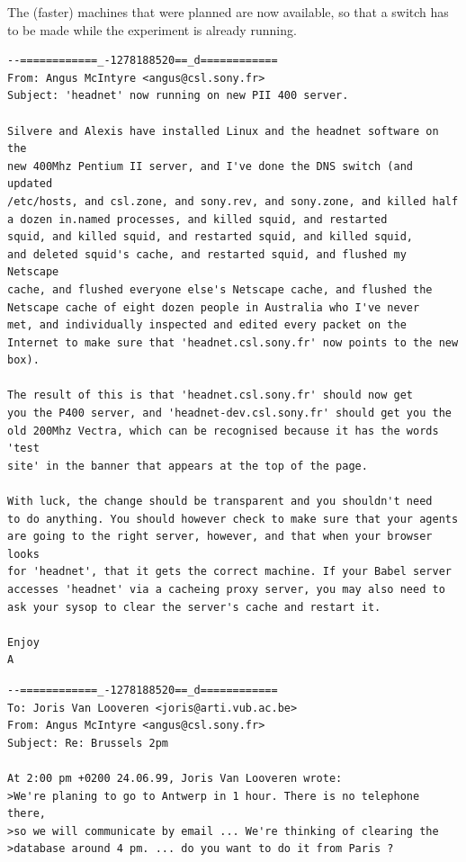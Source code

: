 
The (faster) machines that were planned are now available, so that a switch has to be made while the 
experiment is already running. 
\newline
\footnotesize{
\begin{verbatim}
--============_-1278188520==_d============
From: Angus McIntyre <angus@csl.sony.fr>
Subject: 'headnet' now running on new PII 400 server.

Silvere and Alexis have installed Linux and the headnet software on the 
new 400Mhz Pentium II server, and I've done the DNS switch (and updated
/etc/hosts, and csl.zone, and sony.rev, and sony.zone, and killed half 
a dozen in.named processes, and killed squid, and restarted 
squid, and killed squid, and restarted squid, and killed squid, 
and deleted squid's cache, and restarted squid, and flushed my Netscape
cache, and flushed everyone else's Netscape cache, and flushed the 
Netscape cache of eight dozen people in Australia who I've never 
met, and individually inspected and edited every packet on the 
Internet to make sure that 'headnet.csl.sony.fr' now points to the new box).

The result of this is that 'headnet.csl.sony.fr' should now get 
you the P400 server, and 'headnet-dev.csl.sony.fr' should get you the 
old 200Mhz Vectra, which can be recognised because it has the words 'test 
site' in the banner that appears at the top of the page.

With luck, the change should be transparent and you shouldn't need 
to do anything. You should however check to make sure that your agents 
are going to the right server, however, and that when your browser looks 
for 'headnet', that it gets the correct machine. If your Babel server 
accesses 'headnet' via a cacheing proxy server, you may also need to 
ask your sysop to clear the server's cache and restart it.

Enjoy 
A
\end{verbatim}
\begin{verbatim} 
--============_-1278188520==_d============
To: Joris Van Looveren <joris@arti.vub.ac.be>
From: Angus McIntyre <angus@csl.sony.fr>
Subject: Re: Brussels 2pm

At 2:00 pm +0200 24.06.99, Joris Van Looveren wrote:
>We're planing to go to Antwerp in 1 hour. There is no telephone there,
>so we will communicate by email ... We're thinking of clearing the 
>database around 4 pm. ... do you want to do it from Paris ?


\end{verbatim}}

